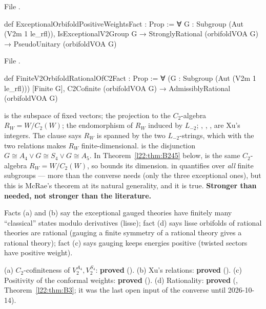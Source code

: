 \noindent File .
\begin{leancode}
def ExceptionalOrbifoldPositiveWeightsFact : Prop :=
  ∀ G : Subgroup (Aut (V2m 1 le_rfl)), IsExceptionalV2Group G →
    StronglyRational (orbifoldVOA G) → PseudoUnitary (orbifoldVOA G)
\end{leancode}
\noindent File .
\begin{leancode}
def FiniteV2OrbifoldRationalOfC2Fact : Prop :=
  ∀ (G : Subgroup (Aut (V2m 1 le_rfl))) [Finite G],
    C2Cofinite (orbifoldVOA G) → AdmissiblyRational (orbifoldVOA G)
\end{leancode}

\begin{dictionary}
 is the subspace of fixed vectors;  the projection to the $C_2$-algebra
$R_W=W/C_2(W)$;  the endomorphism of $R_W$ induced by $L_{-2}$;
, , ,  are Xu's integers. The  clause says
$R_W$ is spanned by the two $L_{-2}$-strings, which with the two relations makes $R_W$ finite-dimensional.
 is the disjunction $G\cong A_4\vee G\cong S_4\vee G\cong A_5$. In
Theorem~\ref{l22:thm:B245} below,  is the same $C_2$-algebra $R_W=W/C_2(W)$, so
 bounds its dimension.
\lean{[Finite G]} in  quantifies over \emph{all} finite subgroups --- more than
the converse needs (only the three exceptional ones), but this is McRae's theorem at its natural generality, and it
is true. \textbf{Stronger than needed, not stronger than the literature.}
\end{dictionary}

\begin{physics}
Facts (a) and (b) say the exceptional gauged theories have finitely many ``classical'' states modulo derivatives
(lisse); fact (d) says lisse orbifolds of rational theories are rational (gauging a finite symmetry of a rational
theory gives a rational theory); fact (c) says gauging keeps energies positive (twisted sectors have positive weight).
\end{physics}

\begin{status}
(a) $C_2$-cofiniteness of $V_2^{A_4},V_2^{S_4}$: \textbf{proved} ().
(b) Xu's relations: \textbf{proved} (). (c) Positivity of the conformal
weights: \textbf{proved} (). (d) Rationality:
\textbf{proved}
(, Theorem~\ref{l22:thm:B3}; it was the last open input of the converse until
2026-10-14).
\end{status}

